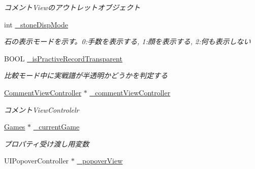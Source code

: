 \begin{DoxyCompactItemize}
\begin{DoxyCompactList}\small\item\em コメントViewのアウトレットオブジェクト \end{DoxyCompactList}\item 
\hypertarget{interface_abstract_record_view_controller_a192865b1b2d15a7df8f8bc482937b603}{
int \hyperlink{interface_abstract_record_view_controller_a192865b1b2d15a7df8f8bc482937b603}{\_\-stoneDispMode}}
\label{interface_abstract_record_view_controller_a192865b1b2d15a7df8f8bc482937b603}

\begin{DoxyCompactList}\small\item\em 石の表示モードを示す。0:手数を表示する, 1:顔を表示する, 2:何も表示しない \end{DoxyCompactList}\item 
\hypertarget{interface_abstract_record_view_controller_a95974f12d7b77527290f08edbcbeed48}{
BOOL \hyperlink{interface_abstract_record_view_controller_a95974f12d7b77527290f08edbcbeed48}{\_\-isPractiveRecordTransparent}}
\label{interface_abstract_record_view_controller_a95974f12d7b77527290f08edbcbeed48}

\begin{DoxyCompactList}\small\item\em 比較モード中に実戦譜が半透明かどうかを判定する \end{DoxyCompactList}\item 
\hypertarget{interface_abstract_record_view_controller_abed47fdca333426ec912c7f3ca670f95}{
\hyperlink{interface_comment_view_controller}{CommentViewController} $\ast$ \hyperlink{interface_abstract_record_view_controller_abed47fdca333426ec912c7f3ca670f95}{\_\-commentViewController}}
\label{interface_abstract_record_view_controller_abed47fdca333426ec912c7f3ca670f95}

\begin{DoxyCompactList}\small\item\em コメントViewControlelr \end{DoxyCompactList}\item 
\hypertarget{interface_abstract_record_view_controller_a83688601809e3c6d2bbb1fed20a6bb52}{
\hyperlink{interface_games}{Games} $\ast$ \hyperlink{interface_abstract_record_view_controller_a83688601809e3c6d2bbb1fed20a6bb52}{\_\-currentGame}}
\label{interface_abstract_record_view_controller_a83688601809e3c6d2bbb1fed20a6bb52}

\begin{DoxyCompactList}\small\item\em プロパティ受け渡し用変数 \end{DoxyCompactList}\item 
\hypertarget{interface_abstract_record_view_controller_afd7973557d4a016cd6c0cca348664ea2}{
UIPopoverController $\ast$ \hyperlink{interface_abstract_record_view_controller_afd7973557d4a016cd6c0cca348664ea2}{\_\-popoverView}}
\label{interface_abstract_record_view_controller_afd7973557d4a016cd6c0cca348664ea2}


\end{DoxyCompactItemize}
